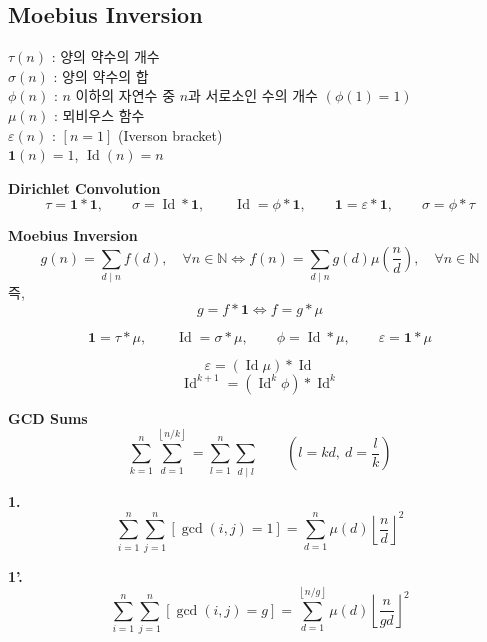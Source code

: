 \subsection{Moebius Inversion}

\noindent
$\tau(n)$ : 양의 약수의 개수 \\
$\sigma(n)$ : 양의 약수의 합 \\
$\phi(n)$ : $n$ 이하의 자연수 중 $n$과 서로소인 수의 개수 $(\phi(1)=1)$ \\
$\mu(n)$ : 뫼비우스 함수 \\
$\varepsilon(n)$ : $[n=1]$ (Iverson bracket) \\
$\mathbf{1}(n)=1$, $\operatorname{Id}(n)=n$

\vspace{5pt}
\noindent \textbf{Dirichlet Convolution} \\
\[
\tau = \mathbf{1} \ast \mathbf{1}, \qquad
\sigma = \operatorname{Id} \ast \mathbf{1}, \qquad
\operatorname{Id} = \phi \ast \mathbf{1}, \qquad
\mathbf{1} = \varepsilon \ast \mathbf{1}, \qquad
\sigma = \phi \ast \tau
\]

\vspace{5pt}
\noindent \textbf{Moebius Inversion} \\
\[
g(n) = \sum_{d \mid n} f(d), \quad \forall n \in \mathbb{N}
\iff
f(n) = \sum_{d \mid n} g(d)\mu\left(\frac{n}{d}\right), \quad \forall n \in \mathbb{N}
\]
즉,
\[
g = f \ast \mathbf{1} \iff f = g \ast \mu
\]

\[
\mathbf{1} = \tau \ast \mu, \qquad
\operatorname{Id} = \sigma \ast \mu, \qquad
\phi = \operatorname{Id} \ast \mu, \qquad
\varepsilon = \mathbf{1} \ast \mu
\]

\[
\varepsilon = (\operatorname{Id}\mu) \ast \operatorname{Id}
\]
\[
\operatorname{Id}^{k+1} = (\operatorname{Id}^{k}\phi) \ast \operatorname{Id}^{k}
\]

\vspace{5pt}
\noindent \textbf{GCD Sums} \\

\[
\sum_{k=1}^{n} \sum_{d=1}^{\left\lfloor n/k \right\rfloor}
=
\sum_{l=1}^{n} \sum_{d \mid l}
\qquad
\left(l=kd,\ d=\frac{l}{k}\right)
\]

\noindent \textbf{1.}
\[
\sum_{i=1}^{n} \sum_{j=1}^{n} [\gcd(i,j)=1]
=
\sum_{d=1}^{n} \mu(d) \left\lfloor \frac{n}{d} \right\rfloor^2
\]

\noindent \textbf{1'.}
\[
\sum_{i=1}^{n} \sum_{j=1}^{n} [\gcd(i,j)=g]
=
\sum_{d=1}^{\left\lfloor n/g \right\rfloor}
\mu(d)
\left\lfloor \frac{n}{gd} \right\rfloor^2
\]

